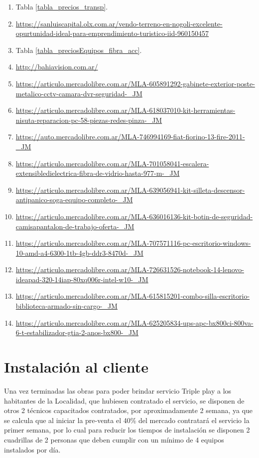 \documentclass[12pt,a4paper]{book}
\begin{document}
\begin{enumerate}
\item \label{cost_inv_13} Tabla \ref{tabla_precios_transp}.
\item \label{cost_inv_1}
\url{https://sanluiscapital.olx.com.ar/vendo-terreno-en-nogoli-excelente-opurtunidad-ideal-para-emprendimiento-turistico-iid-960150457}
\item \label{cost_inv_14} Tabla \ref{tabla_preciosEquipos_fibra_acc}.
\item \label{cost_inv_2}
\url{http://bahiavision.com.ar/}
\item \label{cost_inv_3}
\url{https://articulo.mercadolibre.com.ar/MLA-605891292-gabinete-exterior-poste-metalico-cctv-camara-dvr-seguridad-_JM}
\item \label{cost_inv_4}
\url{https://articulo.mercadolibre.com.ar/MLA-618037010-kit-herramientas-nisuta-reparacion-pc-58-piezas-redes-pinza-_JM}
\item \label{cost_inv_5}
\url{https://auto.mercadolibre.com.ar/MLA-746994169-fiat-fiorino-13-fire-2011-_JM}
\item \label{cost_inv_6}
\url{https://articulo.mercadolibre.com.ar/MLA-701058041-escalera-extensibledielectrica-fibra-de-vidrio-hasta-977-m-_JM}
\item \label{cost_inv_7}
\url{https://articulo.mercadolibre.com.ar/MLA-639056941-kit-silleta-descensor-antipanico-soga-equipo-completo-_JM}
\item \label{cost_inv_8}
\url{https://articulo.mercadolibre.com.ar/MLA-636016136-kit-botin-de-seguridad-camisapantalon-de-trabajo-oferta-_JM}
\item \label{cost_inv_9}
\url{https://articulo.mercadolibre.com.ar/MLA-707571116-pc-escritorio-windows-10-amd-a4-6300-1tb-4gb-ddr3-8470d-_JM}
\item \label{cost_inv_10}
\url{https://articulo.mercadolibre.com.ar/MLA-726631526-notebook-14-lenovo-ideapad-320-14iap-80xq006r-intel-w10-_JM}
\item \label{cost_inv_11}
\url{https://articulo.mercadolibre.com.ar/MLA-615815201-combo-silla-escritorio-biblioteca-armado-sin-cargo-_JM}
\item \label{cost_inv_12}
\url{https://articulo.mercadolibre.com.ar/MLA-625205834-ups-apc-bx800ci-800va-6-t-estabilizador-gtia-2-anos-bx800-_JM}
\end{enumerate}



\section{Instalación al cliente}\label{sec_inst_inicial_plan_accion}
Una vez terminadas las obras para poder brindar servicio Triple play a los habitantes de la Localidad, que hubiesen contratado el servicio, se disponen de otros 2 técnicos capacitados contratados, por aproximadamente 2 semana, ya que se calcula que al iniciar la pre-venta el 40\% del mercado contratará el servicio la primer semana, por lo cual para reducir los tiempos de instalación se disponen 2 cuadrillas de 2 personas que deben cumplir con un mínimo de 4 equipos instalados por día.
\end{document}
